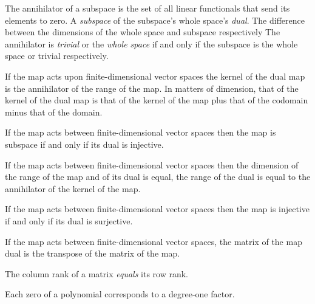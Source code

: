 \begin{multicols}{3}
  The annihilator of a subspace is the set of all linear functionals that send its elements to zero.
   A \textit{subspace} of the subspace's whole space's \textit{dual}.
  The difference between the dimensions of the whole space and subspace respectively
  The annihilator is \textit{trivial} or the \textit{whole space} if and only if the subspace is the whole space or trivial respectively.

  If the map acts upon finite-dimensional vector spaces
  the kernel of the dual map is the annihilator of the range of the map.
  In matters of dimension, that of the kernel of the dual map is that of
  the kernel of the map plus that of the codomain minus that of the domain.
  
  If the map acts between finite-dimensional vector spaces then the map is subspace if and only if its dual is injective.

  If the map acts between finite-dimensional vector spaces then the dimension of the range of the map and of its dual is equal,
  the range of the dual is equal to the annihilator of the kernel of the map.

  If the map acts between finite-dimensional vector spaces then the map is injective if and only if its dual is surjective.

  If the map acts between finite-dimensional vector spaces, the matrix of the map dual is the transpose of the matrix of the map.
  
  The column rank of a matrix \textit{equals} its row rank.

  Each zero of a polynomial corresponds to a degree-one factor.
  
  
  
\end{multicols}


